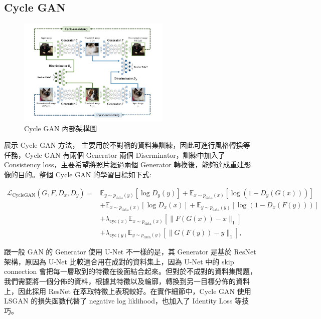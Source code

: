 \documentclass[a4paper, 12pt]{article}
\begin{document}
\begin{CJK}{UTF8}{bkai}
			
		\subsection{Cycle GAN}
		
		\begin{figure}[tbh]
			\centering
			\includegraphics[width=0.65\textwidth]{src/cyclegan.pdf}
			\caption{Cycle GAN 內部架構圖 \cite{medium}}
			\label{fig-CycleGAN_Architecture}
		\end{figure}
		展示 Cycle GAN 方法， 主要用於不對稱的資料集訓練，因此可進行風格轉換等任務，Cycle GAN 有兩個 Generator 兩個 Discrminator，訓練中加入了 Consistency loss，主要希望將照片經過兩個 Generator 轉換後，能夠達成重建影像的目的。整個 Cycle GAN 的學習目標如下式:
		
		\begin{equation}
			\begin{aligned}
			\mathcal{L}_{\text{CycleGAN}}(G, F, D_x, D_y) = &
			\mathbb{E}_{y \sim p_{\text{data}}(y)} \left[ \log D_y(y) \right] + \mathbb{E}_{x \sim p_{\text{data}}(x)} \left[ \log (1 - D_y(G(x))) \right] \\
			&+ \mathbb{E}_{x \sim p_{\text{data}}(x)} \left[ \log D_x(x) \right] + \mathbb{E}_{y \sim p_{\text{data}}(y)} \left[ \log (1 - D_x(F(y))) \right] \\
			&+ \lambda_{\text{cyc}(x)} \mathbb{E}_{x \sim p_{\text{data}}(x)} \left[ \| F(G(x)) - x \|_1 \right] \\
			&+ \lambda_{\text{cyc}(y)} \mathbb{E}_{y \sim p_{\text{data}}(y)} \left[ \| G(F(y)) - y \|_1 \right],
			\end{aligned}
		\end{equation}
			
		
		跟一般 GAN 的 Generator 使用 U-Net 不一樣的是，其 Generator 是基於 ResNet 架構，原因為 U-Net 比較適合用在成對的資料集上，因為 U-Net 中的 skip connection 會把每一層取到的特徵在後面結合起來。但對於不成對的資料集問題，我們需要將一個分佈的資料，根據其特徵以及輪廓，轉換到另一目標分佈的資料上，因此採用 ResNet 在萃取特徵上表現較好。在實作細節中，Cycle GAN 使用 LSGAN \cite{lsgan} 的損失函數代替了 negative log liklihood，也加入了 Identity Loss 等技巧。
		

\end{CJK}
\end{document}
